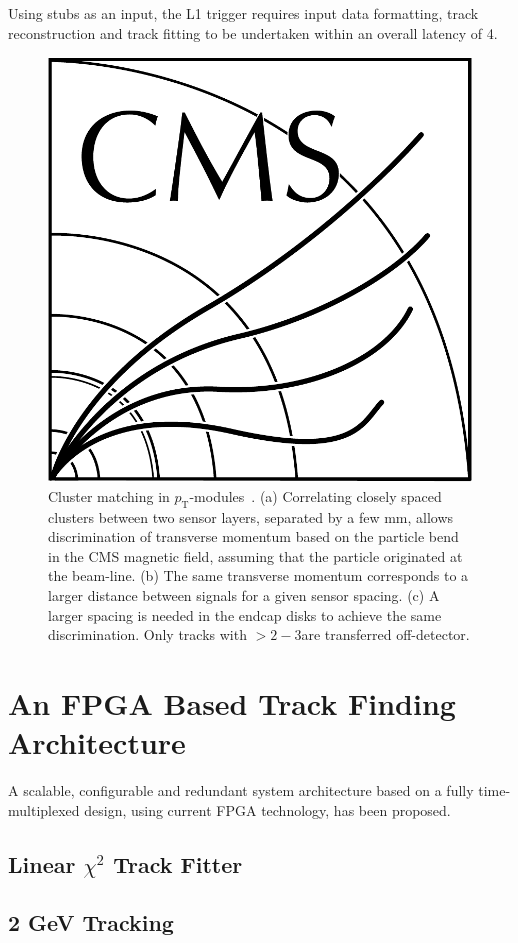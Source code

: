 Using stubs as an input, the L1 trigger requires input data formatting, track reconstruction and track fitting to be undertaken within an overall latency of 4\mus.  

\begin{figure}[!h]
\centering
\includegraphics[width=5in]{CMS-bw-logo.pdf}
\caption{Cluster matching in $p_\mathrm{T}$-modules~\cite{P2TrackerTDR}. (a) Correlating closely spaced clusters between two sensor layers, separated by a few mm, allows discrimination of transverse momentum based on the particle bend in the CMS magnetic field, assuming that the particle originated at the beam-line. (b) The same transverse momentum corresponds to a larger distance between signals for a given sensor spacing. (c) A larger spacing is needed in the endcap disks to achieve the same discrimination. Only tracks with \pT $> 2-3$\GeVc are transferred off-detector.
}
\label{stubs}
\end{figure}

\section{An FPGA Based Track Finding Architecture}

A scalable, configurable and redundant system architecture based on a fully time-multiplexed design, using current FPGA technology, has been proposed.

\subsection{Linear $\chi^{2}$ Track Fitter}

\subsection{2 GeV Tracking}
